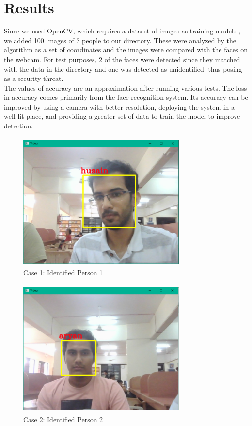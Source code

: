 \documentclass[conference]{IEEEtran}
\begin{document}
	\section{Results}
	Since we used OpenCV, which requires a dataset of images as training models \cite{f}, we added 100 images of 3 people to our directory. These were analyzed by the algorithm as a set of coordinates and the images were compared with the faces on the webcam. For test purposes, 2 of the faces were detected since they matched with the data in the directory and one was detected as unidentified, thus posing as a security threat.\\
	The values of accuracy are an approximation after running various tests. The loss in accuracy comes primarily from the face recognition system. Its accuracy can be improved by using a camera with better resolution, deploying the system in a well-lit place, and providing a greater set of data to train the model to improve detection.\\
	\begin{figure}
		\centering
		\includegraphics[width=8.5cm, height=7cm]{Husain.png}
		\caption{\label{fig:The-caption}Case 1: Identified Person 1}
	\end{figure}
	\begin{figure}
		\centering
		\includegraphics[width=8.5cm, height=7cm]{Aryan.png}
		\caption{\label{fig:The-caption}Case 2: Identified Person 2}
	\end{figure}
\end{document}
